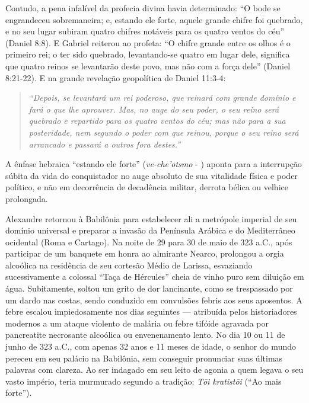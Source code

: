 Contudo, a pena infalível da profecia divina havia determinado:
``O bode se engrandeceu sobremaneira; e, estando ele forte, aquele grande chifre foi quebrado, e no seu lugar subiram quatro chifres notáveis para os quatro ventos do céu'' (Daniel 8:8).
E Gabriel reiterou ao profeta:
``O chifre grande entre os olhos é o primeiro rei; o ter sido quebrado, levantando-se quatro em lugar dele, significa que quatro reinos se levantarão deste povo, mas não com a força dele'' (Daniel 8:21-22).
E na grande revelação geopolítica de Daniel 11:3-4:

\begin{quote}
\itshape ``Depois, se levantará um rei poderoso, que reinará com grande domínio e fará o que lhe aprouver. Mas, no auge do seu poder, o seu reino será quebrado e repartido para os quatro ventos do céu; mas não para a sua posteridade, nem segundo o poder com que reinou, porque o seu reino será arrancado e passará a outros fora destes.''
\end{quote}


A ênfase hebraica ``estando ele forte'' (\textit{ve-che'otsmo} - ) aponta para a interrupção súbita da vida do conquistador no auge absoluto de sua vitalidade física e poder político, e não em decorrência de decadência militar, derrota bélica ou velhice prolongada.

Alexandre retornou à Babilônia para estabelecer ali a metrópole imperial de seu domínio universal e preparar a invasão da Península Arábica e do Mediterrâneo ocidental (Roma e Cartago). Na noite de 29 para 30 de maio de 323 a.C., após participar de um banquete em honra ao almirante Nearco, prolongou a orgia alcoólica na residência de seu cortesão Médio de Larissa, esvaziando sucessivamente a colossal ``Taça de Hércules'' cheia de vinho puro sem diluição em água. Subitamente, soltou um grito de dor lancinante, como se trespassado por um dardo nas costas, sendo conduzido em convulsões febris aos seus aposentos. A febre escalou impiedosamente nos dias seguintes — atribuída pelos historiadores modernos a um ataque violento de malária ou febre tifóide agravada por pancreatite necrosante alcoólica ou envenenamento lento. No dia 10 ou 11 de junho de 323 a.C., com apenas 32 anos e 11 meses de idade, o senhor do mundo pereceu em seu palácio na Babilônia, sem conseguir pronunciar suas últimas palavras com clareza. Ao ser indagado em seu leito de agonia a quem legava o seu vasto império, teria murmurado segundo a tradição: \textit{Tōi kratistōi} (``Ao mais forte'').

